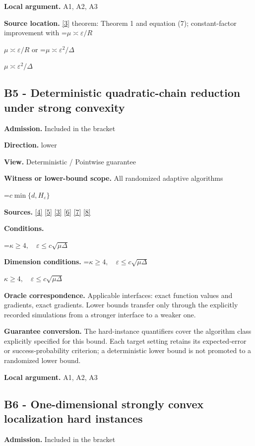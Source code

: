 \documentclass[10pt,a4paper]{article}
\newcommand{\AtlasMath}[1]{\par\begingroup\centering\setbox0=\hbox{$\displaystyle #1$}\ifdim\wd0>1.4\linewidth\typeout{ATLAS WIDE FORMULA: \the\wd0}\fi\ifdim\wd0>\linewidth\resizebox{\linewidth}{!}{\box0}\else\box0\fi\par\endgroup}
\newcommand{\AtlasInlineMath}[1]{\begingroup\setbox0=\hbox{$#1$}\ifdim\wd0>.4\linewidth\endgroup\AtlasMath{#1}\else\endgroup$#1$\fi}
\begin{document}
\textbf{Local argument.} A1, A2, A3

\textbf{Source location.} \href{https://arxiv.org/pdf/2609.10874}{[3]} theorem: Theorem 1 and equation (7); constant-factor improvement with \AtlasInlineMath{\mu\asymp\varepsilon/R} or \AtlasInlineMath{\mu\asymp\varepsilon^2/\Delta}

\subsection{B5 - Deterministic quadratic-chain reduction under strong convexity}
\textbf{Admission.} Included in the bracket

\textbf{Direction.} lower

\textbf{View.} Deterministic / Pointwise guarantee

\textbf{Witness or lower-bound scope.} All randomized adaptive algorithms

\AtlasMath{c\min\{d,H_\varepsilon\}}
\textbf{Sources.} \href{https://arxiv.org/pdf/2101.09740v2}{[4]} \href{https://arxiv.org/pdf/2609.33360v2}{[5]} \href{https://arxiv.org/pdf/2609.10874}{[3]} \href{https://arxiv.org/pdf/1405.4980}{[6]} \href{https://www2.isye.gatech.edu/~nemirovs/MOR_AccuracyCertificates.pdf}{[7]} \href{https://arxiv.org/pdf/2609.20701}{[8]}

\textbf{Conditions.} 
\AtlasMath{\kappa\ge4,\quad\varepsilon\le c\sqrt{\mu\Delta}}


\textbf{Dimension conditions.} \AtlasInlineMath{\kappa\ge4,\quad\varepsilon\le c\sqrt{\mu\Delta}}

\textbf{Oracle correspondence.} Applicable interfaces: exact function values and gradients, exact gradients. Lower bounds transfer only through the explicitly recorded simulations from a stronger interface to a weaker one.

\textbf{Guarantee conversion.} The hard-instance quantifiers cover the algorithm class explicitly specified for this bound. Each target setting retains its expected-error or success-probability criterion; a deterministic lower bound is not promoted to a randomized lower bound.

\textbf{Local argument.} A1, A2, A3

\subsection{B6 - One-dimensional strongly convex localization hard instances}
\textbf{Admission.} Included in the bracket
\end{document}
